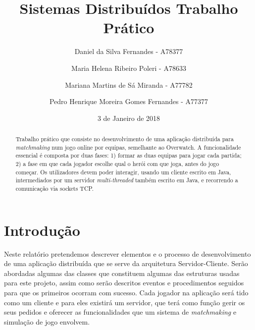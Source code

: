 \documentclass{llncs}
\begin{document}
\mainmatter
\title{Sistemas Distribuídos \newline Trabalho Prático}


\author{Daniel da Silva Fernandes - A78377 \and \newline Maria Helena Ribeiro Poleri - A78633 \and \newline Mariana Martins de Sá Miranda - A77782 \and \newline Pedro Henrique Moreira Gomes Fernandes - A77377}



\date{3 de Janeiro de 2018}


\maketitle
\makeatletter
\let\ps@oldempty\ps@empty %
\renewcommand\ps@empty\ps@plain
\makeatother
\begin{abstract}
Trabalho prático que consiste no desenvolvimento de uma aplicação distribuída para \textit{matchmaking} num jogo online por equipas, semelhante ao Overwatch. 
A funcionalidade essencial é composta por duas fases: 
1) formar as duas equipas para jogar cada partida; 
2) a fase em que cada jogador escolhe qual o herói com que joga, antes do jogo começar. 
Os utilizadores devem poder interagir, usando um cliente escrito em Java, intermediados por um servidor \textit{multi-threaded} também escrito em Java, e recorrendo a comunicação via sockets TCP.
\end{abstract}

\section{Introdução}

Neste relatório pretendemos descrever elementos e o processo de desenvolvimento
de uma aplicação distribuída que se serve da arquitetura Servidor-Cliente. Serão 
abordadas algumas das classes que constituem algumas das estruturas usadas para 
este projeto, assim como serão descritos eventos e procedimentos seguidos para que 
os primeiros ocorram com sucesso. Cada jogador na aplicação será tido como um cliente 
e para eles existirá um servidor, que terá como função gerir os seus pedidos e oferecer 
as funcionalidades que um sistema de \textit{matchmaking} e simulação de jogo envolvem.
 
\end{document}
